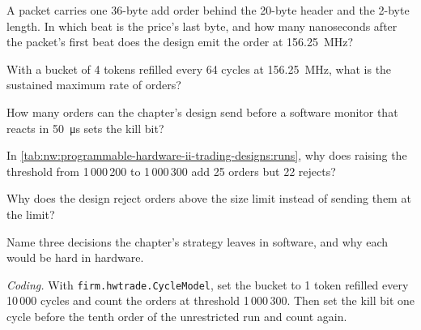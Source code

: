 \begin{exercise}[$\star$]\label{exo:nw:programmable-hardware-ii-trading-designs:1}
A packet carries one 36-byte add order behind the 20-byte header and the 2-byte length. In which beat is the price's last byte, and how many
nanoseconds after the packet's first beat does the design emit the order at 156.25~MHz?
\end{exercise}

\begin{exercise}[$\star$]\label{exo:nw:programmable-hardware-ii-trading-designs:2}
With a bucket of 4 tokens refilled every 64 cycles at 156.25~MHz, what is the sustained maximum rate of orders?
\end{exercise}

\begin{exercise}[$\star$]\label{exo:nw:programmable-hardware-ii-trading-designs:3}
How many orders can the chapter's design send before a software monitor that reacts in \qty{50}{\micro\second} sets the kill bit?
\end{exercise}

\begin{exercise}[$\star\star$]\label{exo:nw:programmable-hardware-ii-trading-designs:4}
In \cref{tab:nw:programmable-hardware-ii-trading-designs:runs}, why does raising the threshold from 1\,000\,200 to 1\,000\,300 add 25 orders but
22 rejects?
\end{exercise}

\begin{exercise}[$\star\star$]\label{exo:nw:programmable-hardware-ii-trading-designs:5}
Why does the design reject orders above the size limit instead of sending them at the limit?
\end{exercise}

\begin{exercise}[$\star\star$]\label{exo:nw:programmable-hardware-ii-trading-designs:6}
Name three decisions the chapter's strategy leaves in software, and why each would be hard in hardware.
\end{exercise}

\begin{exercise}[$\star\star\star$]\label{exo:nw:programmable-hardware-ii-trading-designs:7}
\emph{Coding.} With \texttt{firm.hwtrade.CycleModel}, set the bucket to 1 token refilled every 10\,000 cycles and count the orders at threshold
1\,000\,300. Then set the kill bit one cycle before the tenth order of the unrestricted run and count again.
\end{exercise}

